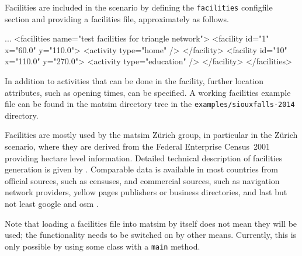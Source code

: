 Facilities are included in the scenario by defining the \lstinline|facilities| \gls{configfile} section and providing a facilities file, approximately as follows.
%
\begin{xml}
...
<facilities name="test facilities for triangle network">
   <facility id="1" x="60.0" y="110.0">
      <activity type="home" />
   </facility>
   <facility id="10" x="110.0" y="270.0">
      <activity type="education" />
   </facility>
</facilities>
\end{xml}
%
In addition to activities that can be done in the facility, further location attributes, such as opening times, can be specified. 
A working facilities example file can be found in the \gls{matsim} directory tree in the \lstinline{examples/siouxfalls-2014} directory.

Facilities are mostly used by the \gls{matsim} Zürich group, in particular in the Zürich scenario, where they are derived from the Federal Enterprise Census~2001 \citep[][]{SwissEnterpriseCensus_manual_2001} providing hectare level information.
Detailed technical description of  facilities generation is given by \citet[][]{Meister_TechRep_IVT_2008}. %
%
Comparable data is available in most countries from official sources, such as censuses, and commercial sources, such as navigation network providers, yellow pages publishers or business directories, and last but not least google and \gls{osm} \citep[][]{OpenStreetMap_Webpage_2015}.

Note that loading a facilities file into \gls{matsim} by itself does not mean they will be used; the functionality needs to be switched on by other means.  Currently, this is only possible by using some class with a \lstinline{main} method.




